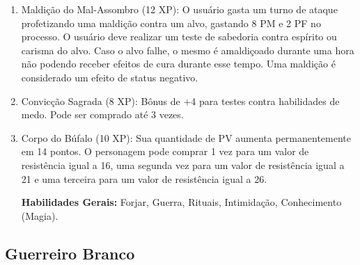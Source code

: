 \begin{enumerate}
\item Maldição do Mal-Assombro (12 XP): O usuário gasta um turno de ataque profetizando uma maldição contra um alvo, gastando 8 PM e 2 PF no processo. O usuário deve realizar um teste de sabedoria contra espírito ou carisma do alvo. Caso o alvo falhe, o mesmo é amaldiçoado durante uma hora não podendo receber efeitos de cura durante esse tempo. Uma maldição é considerado um efeito de status negativo.

\item Convicção Sagrada (8 XP): Bônus de +4 para testes contra habilidades de medo. Pode ser comprado até 3 vezes.

\item Corpo do Búfalo (10 XP): Sua quantidade de PV aumenta permanentemente em 14 pontos. O personagem pode comprar 1 vez para um valor de resistência igual a 16, uma segunda vez para um valor de resistência igual a 21 e uma terceira para um valor de resistência igual a 26.
	

\textbf{Habilidades Gerais:} Forjar, Guerra, Rituais, Intimidação, Conhecimento (Magia).
  
\end{enumerate}

 \subsection{Guerreiro Branco}
  
